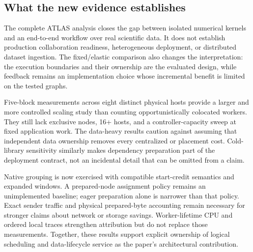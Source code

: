 \subsection{What the new evidence establishes}
The complete ATLAS analysis closes the gap between isolated numerical kernels
and an end-to-end workflow over real scientific data. It does not establish
production collaboration readiness, heterogeneous deployment, or distributed
dataset ingestion. The fixed/elastic comparison also changes the interpretation:
the execution boundaries and their ownership are the evaluated design, while
feedback remains an implementation choice whose incremental benefit is limited
on the tested graphs.

Five-block measurements across eight distinct physical hosts provide a larger
and more controlled scaling study than counting opportunistically colocated
workers. They still lack exclusive nodes, 16+ hosts, and a controller-capacity
sweep at fixed application work. The data-heavy results caution against assuming
that independent data ownership removes every centralized or placement cost.
Cold-library sensitivity similarly makes dependency preparation part of the
deployment contract, not an incidental detail that can be omitted from a claim.

Native grouping is now exercised with compatible start-credit semantics and
expanded windows. A prepared-node assignment policy remains an unimplemented
baseline; eager preparation alone is narrower than that policy. Exact sender
traffic and physical prepared-byte accounting remain necessary for stronger
claims about network or storage savings. Worker-lifetime CPU and ordered local
traces strengthen attribution but do not replace those measurements.
Together, these results support explicit ownership of logical scheduling and
data-lifecycle service as the paper's architectural contribution.

